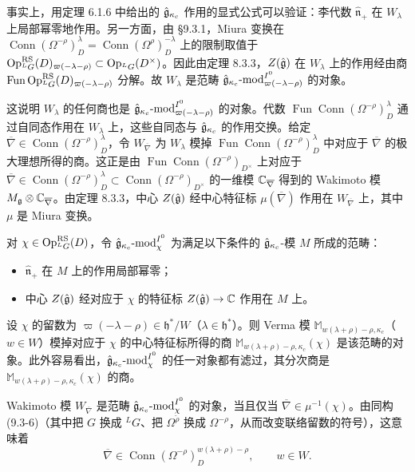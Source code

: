 事实上，用定理 6.1.6 中给出的 $\hat{\mathfrak{g}}_{\kappa_c}$ 作用的显式公式可以验证：李代数 $\hat{\mathfrak{n}}_+$ 在 $W_\lambda$ 上局部幂零地作用。另一方面，由 §9.3.1，Miura 变换在 $\operatorname{Conn}(\Omega^{-\rho})^\lambda_D=\operatorname{Conn}(\Omega^\rho)^{-\lambda}_D$ 上的限制取值于
$\operatorname{Op}^{\mathrm{RS}}_{{}^LG}(D)_{\varpi(-\lambda-\rho)}\subset\operatorname{Op}_{{}^LG}(D^\times)$。因此由定理 8.3.3，$Z(\hat{\mathfrak{g}})$ 在 $W_\lambda$ 上的作用经由商 $\operatorname{Fun}\operatorname{Op}^{\mathrm{RS}}_{{}^LG}(D)_{\varpi(-\lambda-\rho)}$ 分解。故 $W_\lambda$ 是范畴 $\hat{\mathfrak{g}}_{\kappa_c}\text{-mod}^{I^0}_{\varpi(-\lambda-\rho)}$ 的对象。

这说明 $W_\lambda$ 的任何商也是 $\hat{\mathfrak{g}}_{\kappa_c}\text{-mod}^{I^0}_{\varpi(-\lambda-\rho)}$ 的对象。代数 $\operatorname{Fun}\operatorname{Conn}(\Omega^{-\rho})^\lambda_D$ 通过自同态作用在 $W_\lambda$ 上，这些自同态与 $\hat{\mathfrak{g}}_{\kappa_c}$ 的作用交换。给定 $\overline{\nabla}\in\operatorname{Conn}(\Omega^{-\rho})^\lambda_D$，令 $W_{\overline{\nabla}}$ 为 $W_\lambda$ 模掉 $\operatorname{Fun}\operatorname{Conn}(\Omega^{-\rho})^\lambda_D$ 中对应于 $\overline{\nabla}$ 的极大理想所得的商。这正是由 $\operatorname{Fun}\operatorname{Conn}(\Omega^{-\rho})_{D^\times}$ 上对应于 $\overline{\nabla}\in\operatorname{Conn}(\Omega^{-\rho})^\lambda_D\subset\operatorname{Conn}(\Omega^{-\rho})_{D^\times}$ 的一维模 $\mathbb{C}_{\overline{\nabla}}$ 得到的 Wakimoto 模 $M_{\mathfrak{g}}\otimes\mathbb{C}_{\overline{\nabla}}$。由定理 8.3.3，中心 $Z(\hat{\mathfrak{g}})$ 经中心特征标 $\mu(\overline{\nabla})$ 作用在 $W_{\overline{\nabla}}$ 上，其中 $\mu$ 是 Miura 变换。

对 $\chi\in\operatorname{Op}^{\mathrm{RS}}_{{}^LG}(D)$，令 $\hat{\mathfrak{g}}_{\kappa_c}\text{-mod}^{I^0}_\chi$ 为满足以下条件的 $\hat{\mathfrak{g}}_{\kappa_c}$-模 $M$ 所成的范畴：
\begin{itemize}
    \item $\hat{\mathfrak{n}}_+$ 在 $M$ 上的作用局部幂零；
    \item 中心 $Z(\hat{\mathfrak{g}})$ 经对应于 $\chi$ 的特征标 $Z(\hat{\mathfrak{g}})\to\mathbb{C}$ 作用在 $M$ 上。
\end{itemize}
设 $\chi$ 的留数为 $\varpi(-\lambda-\rho)\in\mathfrak{h}^*/W$（$\lambda\in\mathfrak{h}^*$）。则 Verma 模 $\mathbb{M}_{w(\lambda+\rho)-\rho,\kappa_c}$（$w\in W$）模掉对应于 $\chi$ 的中心特征标所得的商 $\mathbb{M}_{w(\lambda+\rho)-\rho,\kappa_c}(\chi)$ 是该范畴的对象。此外容易看出，$\hat{\mathfrak{g}}_{\kappa_c}\text{-mod}^{I^0}_\chi$ 的任一对象都有滤过，其分次商是 $\mathbb{M}_{w(\lambda+\rho)-\rho,\kappa_c}(\chi)$ 的商。

Wakimoto 模 $W_{\overline{\nabla}}$ 是范畴 $\hat{\mathfrak{g}}_{\kappa_c}\text{-mod}^{I^0}_\chi$ 的对象，当且仅当 $\overline{\nabla}\in\mu^{-1}(\chi)$。由同构 (9.3-6)（其中把 $G$ 换成 ${}^LG$、把 $\Omega^{\check\rho}$ 换成 $\Omega^{-\rho}$，从而改变联络留数的符号），这意味着
\begin{equation}
    \overline{\nabla}\in\operatorname{Conn}(\Omega^{-\rho})^{w(\lambda+\rho)-\rho}_D,
    \qquad w\in W.
    \tag{9.4-6}
\end{equation}

